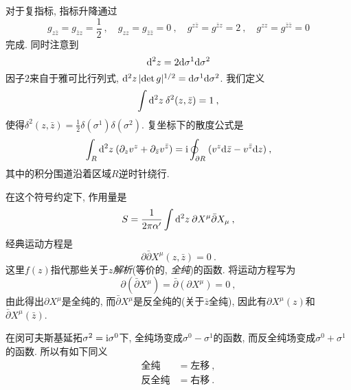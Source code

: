 对于复指标, 指标升降通过
\begin{equation}
g_{z \bar{z}}=g_{\bar{z} z}=\frac{1}{2} \:, \quad g_{z z}=g_{\bar{z} \bar{z}}=0 \:, \quad g^{z \bar{z}}=g^{\bar{z} z}=2 \:, \quad g^{z z}=g^{\bar{z} \bar{z}}=0
\end{equation}
完成. 同时注意到
\begin{equation}
\mathrm{d}^{2} z=2 \mathrm{d} \sigma^{1} \mathrm{d} \sigma^{2}
\end{equation}
因子$2$来自于雅可比行列式, $\mathrm{d}^{2} z\, \lvert \operatorname{det} g\rvert^{1/2}= \mathrm{d} \sigma^{1} \mathrm{d} \sigma^{2}$. 我们定义
\begin{equation}
\int \mathrm{d}^{2} z \: \delta^{2}(z, \bar{z})=1 \:,
\end{equation}
使得$\delta^{2}(z, \bar{z})=\tfrac{1}{2} \delta(\sigma^{1}) \delta(\sigma^{2})$. 复坐标下的散度公式是
\begin{equation}
\int_{R} \mathrm{d}^{2}z\: (\partial_{z} v^{z}+\partial_{\bar{z}} v^{\bar{z}} )= \mathrm{i} \oint_{\partial R}\: (v^{z} \mathrm{d} \bar{z}-v^{\bar{z}} \mathrm{d} z ) \:, \label{2.1.9}
\end{equation}
其中的积分围道沿着区域$R$逆时针绕行. 

在这个符号约定下, 作用量是
\begin{equation}
S=\frac{1}{2 \pi \alpha^{\prime}} \int \mathrm{d}^{2} z\: \partial X^{\mu} \bar{\partial} X_{\mu} \:, \label{2.1.10}
\end{equation}
经典运动方程是
\begin{equation}
\partial \bar{\partial} X^{\mu}(z, \bar{z})=0 \:. \label{2.1.11}
\end{equation}
这里$f(z)$指代那些关于$z$\emph{解析}(等价的, \emph{全纯})的函数. 将运动方程写为
\begin{equation}
\partial(\bar{\partial} X^{\mu})=\bar{\partial}(\partial X^{\mu})=0 \:, \label{2.1.12}
\end{equation}
由此得出$\partial X^{\mu}$是全纯的, 而$\bar{\partial} X^{\mu}$是反全纯的(关于$\bar{z}$全纯), 因此有$\partial X^{\mu}(z)$和$\bar{\partial} X^{\mu}(\bar{z})$.

在闵可夫斯基延拓$\sigma^{2}=\mathrm{i} \sigma^{0}$下, 全纯场变成$\sigma^{0}-\sigma^{1}$的函数, 而反全纯场变成$\sigma^{0}+\sigma^{1}$的函数. 所以有如下同义
\begin{subequations}
\begin{align}
{\text{全纯}}&=\text {左移}  \:,\\
{\text{反全纯}}&=\text {右移} \:.
\end{align}
\end{subequations}


